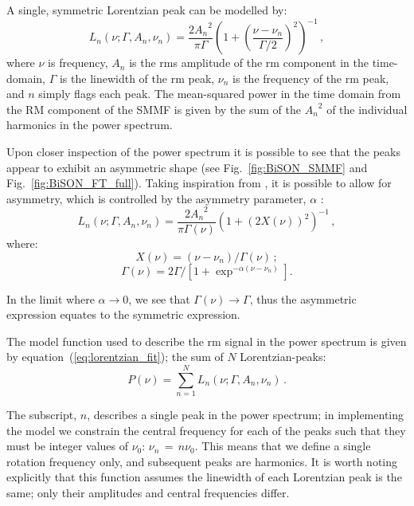 A single, symmetric Lorentzian peak can be modelled by:
%
\begin{equation}
L_n(\nu; \Gamma, A_n, \nu_n) = \frac{2{A_n}^2}{\pi \Gamma} \left(1 + \left(\frac{\nu - \nu_{n}}{\Gamma /2}\right)^2\right)^{-1} \, ,
\label{eq:symm_lorentzian}
\end{equation}
%
where $\nu$ is frequency, $A_n$ is the \gls{rms} amplitude of the \gls{rm} component in the time-domain, $\Gamma$ is the linewidth of the \gls{rm} peak, $\nu_n$ is the frequency of the \gls{rm} peak, and $n$ simply flags each peak. The mean-squared power in the time domain from the RM component of the SMMF is given by the sum of the ${A_n}^2$ of the individual harmonics in the power spectrum.

Upon closer inspection of the power spectrum it is possible to see that the peaks appear to exhibit an asymmetric shape (see Fig.~\ref{fig:BiSON_SMMF} and Fig.~\ref{fig:BiSON_FT_full}). Taking inspiration from \citet{howe_solar_2020}, it is possible to allow for asymmetry, which is controlled by the asymmetry parameter, $\alpha$ \citep{stancik_simple_2008}:
%
\begin{equation}
L_n(\nu; \Gamma, A_n, \nu_n) = \frac{2{A_n}^2}{\pi \Gamma(\nu)} \left(1 + \left(2X(\nu)\right)^2\right)^{-1} \, ,
\label{eq:asymm_lorentzian}
\end{equation}
%
where:
%
\begin{equation}
X(\nu) = (\nu - \nu_n)/\Gamma(\nu) \, ;
\label{eq:asymm_freq}
\end{equation}
%
\begin{equation}
\Gamma(\nu) = 2\Gamma / [1 + \exp^{-\alpha(\nu - \nu_n)}] .
\label{eq:asymm_width}
\end{equation}

In the limit where $\alpha \rightarrow 0$, we see that $\Gamma(\nu) \rightarrow \Gamma$, thus the asymmetric expression equates to the symmetric expression.

The model function used to describe the \gls{rm} signal in the power spectrum is given by equation~(\ref{eq:lorentzian_fit}); the sum of $N$ Lorentzian-peaks:
%
\begin{equation}
P(\nu) = \sum_{n=1}^{N} L_n(\nu; \Gamma, A_n, \nu_n) \, .
\label{eq:lorentzian_fit}
\end{equation}

The subscript, $n$, describes a single peak in the power spectrum; in implementing the model we constrain the central frequency for each of the peaks such that they must be integer values of $\nu_0$: $\nu_n \, = \, n \nu_0$. This means that we define a single rotation frequency only, and subsequent peaks are harmonics. It is worth noting explicitly that this function assumes the linewidth of each Lorentzian peak is the same; only their amplitudes and central frequencies differ.

